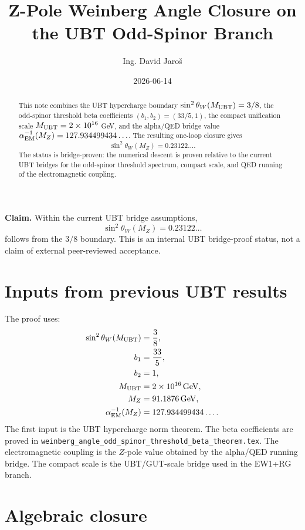 \documentclass[12pt,a4paper]{article}
\title{Z-Pole Weinberg Angle Closure on the UBT Odd-Spinor Branch}
\author{Ing. David Jaroš}
\date{2026-06-14}
\begin{document}
\maketitle

\begin{abstract}
This note combines the UBT hypercharge boundary
$\sin^2\theta_W(M_{\rm UBT})=3/8$, the odd-spinor threshold beta coefficients
$(b_1,b_2)=(33/5,1)$, the compact unification scale
$M_{\rm UBT}=2\times10^{16}$ GeV, and the alpha/QED bridge value
$\alpha_{\rm EM}^{-1}(M_Z)=127.934499434\ldots$.  The resulting one-loop
closure gives
\[
  \sin^2\theta_W(M_Z)=0.23122\ldots.
\]
The status is bridge-proven: the numerical descent is proven relative to the
current UBT bridges for the odd-spinor threshold spectrum, compact scale, and
QED running of the electromagnetic coupling.
\end{abstract}

\begin{statusbox}
\textbf{Claim.}  Within the current UBT bridge assumptions,
\[
  \boxed{\sin^2\theta_W(M_Z)=0.23122\ldots}
\]
follows from the $3/8$ boundary.  This is an internal UBT bridge-proof status,
not a claim of external peer-reviewed acceptance.
\end{statusbox}

\section{Inputs from previous UBT results}

The proof uses:
\begin{align}
  \sin^2\theta_W(M_{\rm UBT})&=\frac38,\\
  b_1&=\frac{33}{5},\\
  b_2&=1,\\
  M_{\rm UBT}&=2\times10^{16}\,\mathrm{GeV},\\
  M_Z&=91.1876\,\mathrm{GeV},\\
  \alpha_{\rm EM}^{-1}(M_Z)&=127.934499434\ldots.
\end{align}
The first input is the UBT hypercharge norm theorem.  The beta coefficients are
proved in \texttt{weinberg\_angle\_odd\_spinor\_threshold\_beta\_theorem.tex}.
The electromagnetic coupling is the $Z$-pole value obtained by the alpha/QED
running bridge.  The compact scale is the UBT/GUT-scale bridge used in the
EW1+RG branch.

\section{Algebraic closure}
\end{document}

